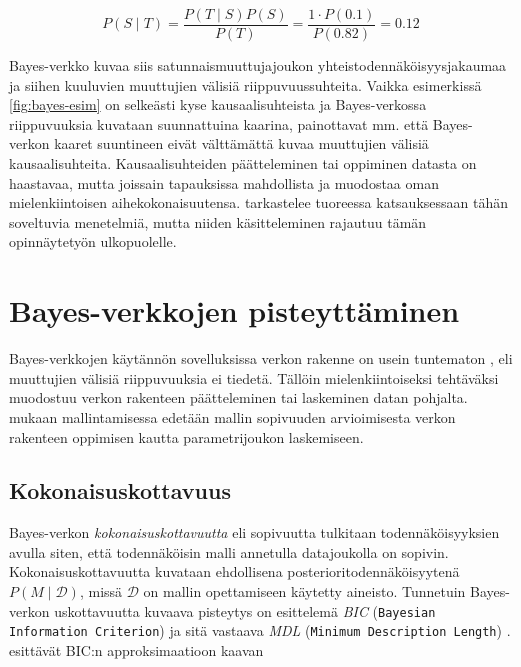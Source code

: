 $$
  P(S \mid T) = \frac{P(T \mid S)P(S)}{P(T)} = \frac{1 \cdot P(0.1)}{P(0.82)} = 0.12   
$$

Bayes-verkko kuvaa siis satunnaismuuttujajoukon yhteistodennäköisyysjakaumaa ja siihen kuuluvien muuttujien välisiä riippuvuussuhteita. Vaikka esimerkissä \ref{fig:bayes-esim} on selkeästi kyse kausaalisuhteista ja Bayes-verkossa riippuvuuksia kuvataan suunnattuina kaarina, painottavat mm. \citet{ruggeri_bayesian_2008, myllymaki_bayes-verkkojen_1998} että Bayes-verkon kaaret suuntineen eivät välttämättä kuvaa muuttujien välisiä kausaalisuhteita. Kausaalisuhteiden päätteleminen tai oppiminen datasta on haastavaa, mutta joissain tapauksissa mahdollista ja muodostaa oman mielenkiintoisen aihekokonaisuutensa. \citet{vowels_dya_2022} tarkastelee tuoreessa katsauksessaan tähän soveltuvia menetelmiä, mutta niiden käsitteleminen rajautuu tämän opinnäytetyön ulkopuolelle.

\section{Bayes-verkkojen pisteyttäminen}

Bayes-verkkojen käytännön sovelluksissa verkon rakenne on usein tuntematon \citep{ruggeri_bayesian_2008}, eli muuttujien välisiä riippuvuuksia ei tiedetä. Tällöin mielenkiintoiseksi tehtäväksi muodostuu verkon rakenteen päätteleminen tai laskeminen datan pohjalta. \citet{myllymaki_bayes-verkkojen_1998} mukaan mallintamisessa edetään mallin sopivuuden arvioimisesta verkon rakenteen oppimisen kautta parametrijoukon laskemiseen.

\subsection{Kokonaisuskottavuus}

Bayes-verkon \emph{kokonaisuskottavuutta} eli sopivuutta \citep{myllymaki_bayes-verkkojen_1998} tulkitaan todennäköisyyksien avulla siten, että todennäköisin malli annetulla datajoukolla on sopivin. Kokonaisuskottavuutta kuvataan ehdollisena posterioritodennäköisyytenä $P(M \mid \mathcal{D})$, missä $\mathcal{D}$ on mallin opettamiseen käytetty aineisto. Tunnetuin Bayes-verkon uskottavuutta kuvaava pisteytys on \citet{schwarz_estimating_1978} esittelemä \emph{BIC} (\texttt{Bayesian Information Criterion}) ja sitä vastaava \emph{MDL} (\texttt{Minimum Description Length}) \citep{ruggeri_bayesian_2008, liu_empirical_2012}. \citet{myllymaki_bayes-verkkojen_1998} esittävät BIC:n approksimaatioon kaavan

